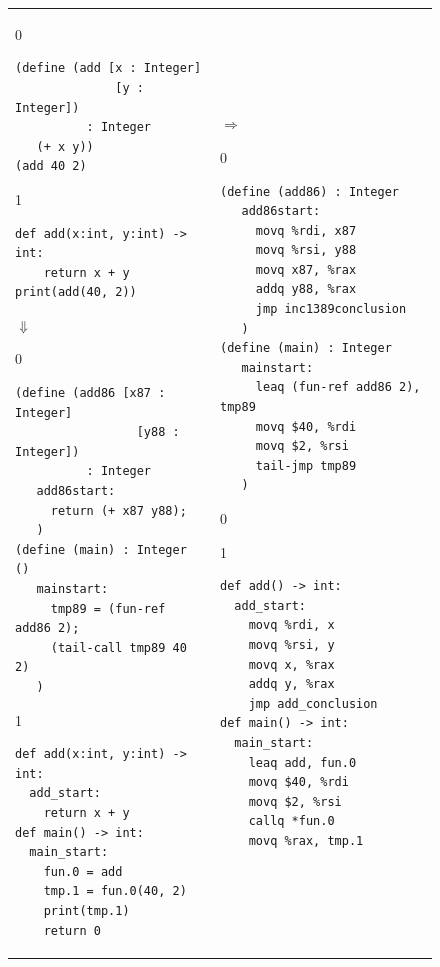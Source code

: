 \documentclass[7x10]{TimesAPriori_MIT}%
\def\racketEd{0}
\def\pythonEd{1}
\def\edition{1}
\def\xeightysixEd{0}
\def\architecture{1}
\newcommand{\pythonColor}[0]{}
\numberwithin{theorem}{chapter}
\numberwithin{definition}{chapter}
\numberwithin{equation}{chapter}
\begin{document}
\begin{figure}[hbtp]
  \begin{tcolorbox}[colback=white]
    \begin{tabular}{ll}
\begin{minipage}{0.4\textwidth}
{\if\edition\racketEd
\begin{lstlisting}[basicstyle=\ttfamily\footnotesize]
(define (add [x : Integer]
              [y : Integer])
          : Integer
   (+ x y))
(add 40 2)
\end{lstlisting}
\fi}
{\if\edition\pythonEd\pythonColor
\begin{lstlisting}[basicstyle=\ttfamily\footnotesize]
def add(x:int, y:int) -> int:
    return x + y
print(add(40, 2))
\end{lstlisting}
\fi}
$\Downarrow$
{\if\edition\racketEd
\begin{lstlisting}[basicstyle=\ttfamily\footnotesize]
(define (add86 [x87 : Integer]
                 [y88 : Integer])
          : Integer
   add86start:
     return (+ x87 y88);
   )
(define (main) : Integer ()
   mainstart:
     tmp89 = (fun-ref add86 2);
     (tail-call tmp89 40 2)
   )
\end{lstlisting}
\fi}
{\if\edition\pythonEd\pythonColor
\begin{lstlisting}[basicstyle=\ttfamily\footnotesize]
def add(x:int, y:int) -> int:
  add_start:
    return x + y
def main() -> int:
  main_start:
    fun.0 = add
    tmp.1 = fun.0(40, 2)
    print(tmp.1)
    return 0
\end{lstlisting}
\fi}
\end{minipage}
&
$\Rightarrow$
\begin{minipage}{0.5\textwidth}
{\if\edition\racketEd
\begin{lstlisting}[basicstyle=\ttfamily\footnotesize]
(define (add86) : Integer
   add86start:
     movq %rdi, x87
     movq %rsi, y88
     movq x87, %rax
     addq y88, %rax
     jmp inc1389conclusion
   )
(define (main) : Integer
   mainstart:
     leaq (fun-ref add86 2), tmp89
     movq $40, %rdi
     movq $2, %rsi
     tail-jmp tmp89
   )
\end{lstlisting}
\fi}
{\if\architecture\xeightysixEd
  {\if\edition\pythonEd\pythonColor
\begin{lstlisting}[basicstyle=\ttfamily\footnotesize]
def add() -> int:
  add_start:
    movq %rdi, x
    movq %rsi, y
    movq x, %rax
    addq y, %rax
    jmp add_conclusion
def main() -> int:
  main_start:
    leaq add, fun.0
    movq $40, %rdi
    movq $2, %rsi
    callq *fun.0
    movq %rax, tmp.1

\end{lstlisting}}}
\end{minipage}
\end{tabular}
\end{tcolorbox}
\end{figure}
\end{document}
